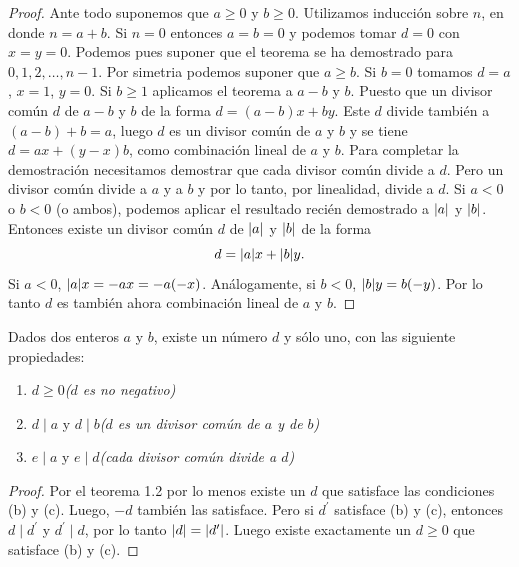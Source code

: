 \documentclass[12pt,a4paper]{book}
\begin{document}
    \begin{proof}
        Ante todo suponemos que $a\geq0$ y $b\geq0$. Utilizamos inducción sobre $n$, en donde
        $n=a+b$. Si $n=0$ entonces $a=b=0$ y podemos tomar $d=0$ con $x=y=0$. Podemos pues suponer
        que el teorema se ha demostrado para $0,1,2,\dots,n-1$. Por simetria podemos suponer que
        $a\geq b$. Si $b=0$ tomamos $d=a$, $x=1$, $y=0$. Si $b\geq1$ aplicamos el teorema a
        $a-b$ y $b$. Puesto que un divisor común $d$ de $a-b$ y $b$ de la forma $d=(a-b)x+by$.
        Este $d$ divide también a $(a-b)+b=a$, luego $d$ es un divisor común de $a$ y $b$ y se
        tiene $d=ax+(y-x)b$, como combinación lineal de $a$ y $b$. Para completar la demostración
        necesitamos demostrar que cada divisor común divide a $d$. Pero un divisor común divide
        a $a$ y a $b$ y por lo tanto, por linealidad, divide a $d$. Si $a\lt0$ o $b\lt0$ (o ambos),
        podemos aplicar el resultado recién demostrado a $\abs{a}$ y $\abs{b}$. Entonces existe
        un divisor común  $d$ de $\abs{a}$ y $\abs{b}$ de la forma
        \begin{equation*}
            d=\abs{a}x+\abs{b}y.
        \end{equation*}
        Si $a\lt0$, $\abs{a}x=-ax=-a(-x)$. Análogamente, si $b\lt0$, $\abs{b}y=b(-y)$. Por
        lo tanto $d$ es también ahora combinación lineal de $a$ y $b$.
    \end{proof}

    \begin{teorema}
        Dados dos enteros $a$ y $b$, existe un número $d$ y sólo uno, con las siguiente
        propiedades:
        \begin{enumerate}
            \item[(a)] $d\geq0$\hfill\textit{($d$ es no negativo)}
            \item[(b)] $d\mid a$ y $d\mid b$\hfill\textit{($d$ es un divisor común de $a$ y de $b$)}
            \item[(c)] $e\mid a$ y $e\mid d$\hfill\textit{(cada divisor común divide a $d$)}  
        \end{enumerate}
    \end{teorema}

    \begin{proof}
        Por el teorema 1.2 por lo menos existe un $d$ que satisface las condiciones (b) y (c).
        Luego, $-d$ también las satisface. Pero si $d^{\prime}$ satisface (b) y (c), entonces
        $d\mid d^{\prime}$ y $d^{\prime}\mid d$, por lo tanto $\abs{d}=\abs{d^{\prime}}$. Luego
        existe exactamente un $d\geq0$ que satisface (b) y (c).
    \end{proof}
    
\end{document}
